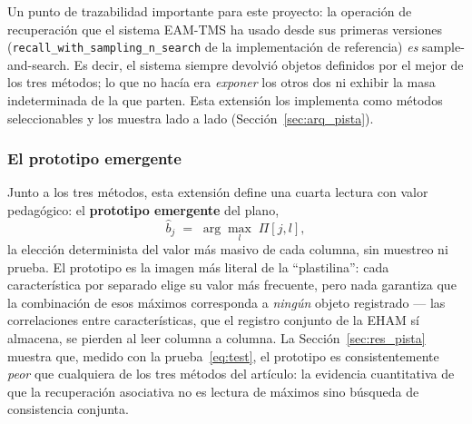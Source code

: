 Un punto de trazabilidad importante para este proyecto: la operación de recuperación
que el sistema EAM-TMS ha usado desde sus primeras versiones
(\texttt{recall\_with\_sampling\_n\_search} de la implementación de referencia)
\emph{es} sample-and-search.
Es decir, el sistema siempre devolvió objetos definidos por el mejor de los tres
métodos; lo que no hacía era \emph{exponer} los otros dos ni exhibir la masa
indeterminada de la que parten.
Esta extensión los implementa como métodos seleccionables y los muestra lado a lado
(Sección~\ref{sec:arq_pista}).

\subsubsection*{El prototipo emergente}

Junto a los tres métodos, esta extensión define una cuarta lectura con valor
pedagógico: el \textbf{prototipo emergente} del plano,
\begin{equation}
    \hat{b}_j \;=\; \arg\max_{l}\; \Pi[j, l],
    \label{eq:prototipo}
\end{equation}
la elección determinista del valor más masivo de cada columna, sin muestreo ni
prueba.
El prototipo es la imagen más literal de la ``plastilina'': cada característica por
separado elige su valor más frecuente, pero nada garantiza que la combinación de esos
máximos corresponda a \emph{ningún} objeto registrado --- las correlaciones entre
características, que el registro conjunto de la EHAM sí almacena, se pierden al leer
columna a columna.
La Sección~\ref{sec:res_pista} muestra que, medido con la prueba~\eqref{eq:test}, el
prototipo es consistentemente \emph{peor} que cualquiera de los tres métodos del
artículo: la evidencia cuantitativa de que la recuperación asociativa no es lectura de
máximos sino búsqueda de consistencia conjunta.
